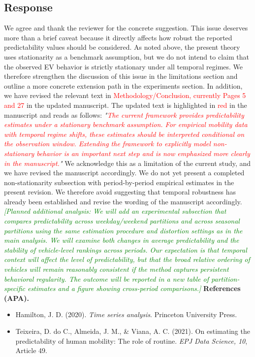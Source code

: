 \documentclass{NSF}
\begin{document}
\subsection{Response}
We agree and thank the reviewer for the concrete suggestion. This issue deserves more than a brief caveat because it directly affects how robust the reported predictability values should be considered. As noted above, the present theory uses stationarity as a benchmark assumption, but we do not intend to claim that the observed EV behavior is strictly stationary under all temporal regimes. We therefore strengthen the discussion of this issue in the limitations section and outline a more concrete extension path in the experiments section.
\noindent In addition, we have revised the relevant text in \textcolor{red}{Methodology/Conclusion, currently Pages 5 and 27} in the updated manuscript. The updated text is highlighted in \textcolor{red}{red} in the manuscript and reads as follows:
\vskip 0.1cm
\noindent \textit{"\textcolor{red}{The current framework provides predictability estimates under a stationary benchmark assumption. For empirical mobility data with temporal regime shifts, these estimates should be interpreted conditional on the observation window. Extending the framework to explicitly model non-stationary behavior is an important next step and is now emphasized more clearly in the manuscript.}"}
\vskip 0.05in
\noindent We acknowledge this as a limitation of the current study, and we have revised the manuscript accordingly. We do not yet present a completed non-stationarity subsection with period-by-period empirical estimates in the present revision. We therefore avoid suggesting that temporal robustness has already been established and revise the wording of the manuscript accordingly.
\vskip 0.05in
\noindent\textcolor{green}{\textit{[Planned additional analysis: We will add an experimental subsection that compares predictability across weekday/weekend partitions and across seasonal partitions using the same estimation procedure and distortion settings as in the main analysis. We will examine both changes in average predictability and the stability of vehicle-level rankings across periods. Our expectation is that temporal context will affect the level of predictability, but that the broad relative ordering of vehicles will remain reasonably consistent if the method captures persistent behavioral regularity. The outcome will be reported in a new table of partition-specific estimates and a figure showing cross-period comparisons.]}}
\vskip 0.05in
\noindent\textbf{References (APA).}
\begin{itemize}
    \item Hamilton, J. D. (2020). \textit{Time series analysis}. Princeton University Press.
    \item Teixeira, D. do C., Almeida, J. M., \& Viana, A. C. (2021). On estimating the predictability of human mobility: The role of routine. \textit{EPJ Data Science, 10}, Article 49.
\end{itemize}
\end{document}
